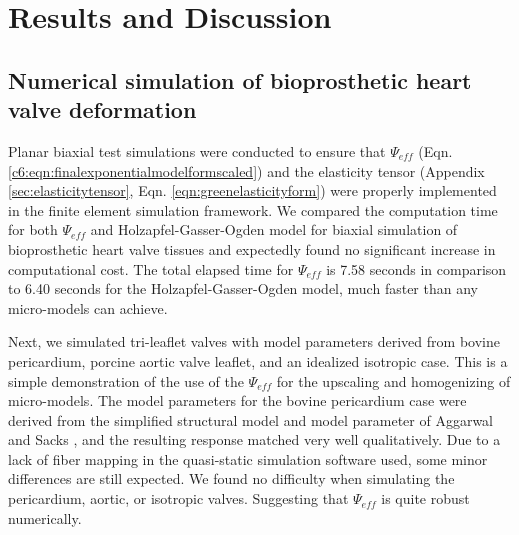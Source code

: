 \section{Results and Discussion}



\subsection{Numerical simulation of bioprosthetic heart valve deformation}
	
    Planar biaxial test simulations were conducted to ensure that $\Psi_{eff}$ (Eqn. \ref{c6:eqn:finalexponentialmodelformscaled}) and the elasticity tensor (Appendix \ref{sec:elasticitytensor}, Eqn. \ref{eqn:greenelasticityform}) were properly implemented in the finite element simulation framework.  We compared the computation time for both $\Psi_{eff}$ and Holzapfel-Gasser-Ogden model for biaxial simulation of bioprosthetic heart valve tissues and expectedly found no significant increase in computational cost. The total elapsed time for $\Psi_{eff}$ is 7.58 seconds in comparison to 6.40 seconds for the Holzapfel-Gasser-Ogden model, much faster than any micro-models can achieve.  

    Next, we simulated tri-leaflet valves with model parameters derived from bovine pericardium, porcine aortic valve leaflet, and an idealized isotropic case. This is a simple demonstration of the use of the $\Psi_{eff}$ for the upscaling and homogenizing of micro-models. The model parameters for the bovine pericardium case were derived from the simplified structural model and model parameter of Aggarwal and Sacks \cite{aggarwal_inverse_2015}, and the resulting response matched very well qualitatively. Due to a lack of fiber mapping in the quasi-static simulation software used, some minor differences are still expected. We found no difficulty when simulating the pericardium, aortic, or isotropic valves. Suggesting that $\Psi_{eff}$ is quite robust numerically.
    
